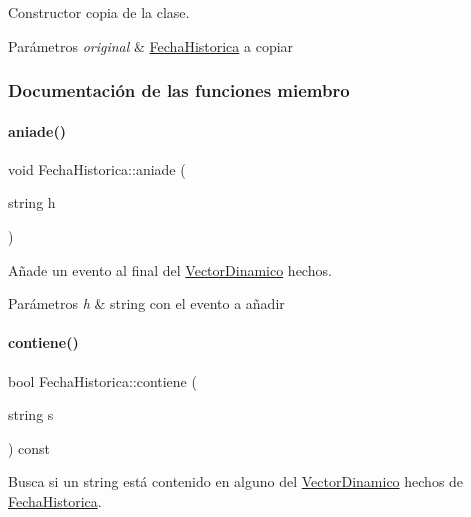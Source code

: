 Constructor copia de la clase. 


\begin{DoxyParams}{Parámetros}
{\em original} & {\ttfamily \hyperlink{classFechaHistorica}{Fecha\+Historica}} a copiar \\
\hline
\end{DoxyParams}


\subsubsection{Documentación de las funciones miembro}
\mbox{\label{classFechaHistorica_a26dcd8284405e97a513c258c352ecc0e}} 
\paragraph{\texorpdfstring{aniade()}{aniade()}}
{\footnotesize\ttfamily void Fecha\+Historica\+::aniade (\begin{DoxyParamCaption}\item[{string}]{h }\end{DoxyParamCaption})}



Añade un evento al final del {\ttfamily \hyperlink{classVectorDinamico}{Vector\+Dinamico}} hechos. 


\begin{DoxyParams}{Parámetros}
{\em h} & string con el evento a añadir \\
\hline
\end{DoxyParams}
\mbox{\label{classFechaHistorica_a640b4e6aab53202cb5127267927b44a0}} 
\paragraph{\texorpdfstring{contiene()}{contiene()}}
{\footnotesize\ttfamily bool Fecha\+Historica\+::contiene (\begin{DoxyParamCaption}\item[{string}]{s }\end{DoxyParamCaption}) const}



Busca si un string está contenido en alguno del {\ttfamily \hyperlink{classVectorDinamico}{Vector\+Dinamico}} hechos de {\ttfamily \hyperlink{classFechaHistorica}{Fecha\+Historica}}. 


